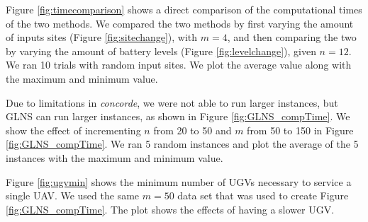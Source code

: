 \documentclass[letterpaper,10pt,conference]{ieeeconf}
\begin{document}
Figure \ref{fig:timecomparison} shows a direct comparison of the computational times of the two methods. We compared the two methods by first varying the amount of inputs sites (Figure \ref{fig:sitechange}), with $m = 4$, and then comparing the two by varying the amount of battery levels (Figure \ref{fig:levelchange}), given $n = 12$. We ran 10 trials with random input sites. We plot the average value along with the maximum and minimum value.

Due to limitations in \emph{concorde}, we were not able to run larger instances, but GLNS can run larger instances, as shown in Figure \ref{fig:GLNS_compTime}. We show the effect of incrementing $n$ from 20 to 50 and $m$ from 50 to 150 in Figure \ref{fig:GLNS_compTime}. We ran 5 random instances and plot the average of the 5 instances with the maximum and minimum value.

Figure \ref{fig:ugvmin} shows the minimum number of UGVs necessary to service a single UAV. We used the same $m = 50$ data set that was used to create Figure \ref{fig:GLNS_compTime}. The plot shows the effects of having a slower UGV.

\end{document}
